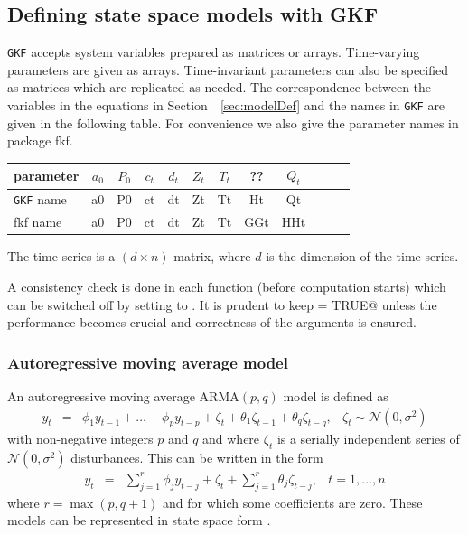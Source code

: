 \documentclass{article}
\newcommand{\GKF}{\texttt{GKF}\xspace}
\begin{document}
\subsection{Defining state space models with GKF}

\GKF accepts system variables prepared as matrices or arrays. Time-varying parameters are
given as arrays. Time-invariant parameters can also be specified as matrices which are
replicated as needed.
The correspondence between the variables in the equations in  Section~~\ref{sec:modelDef} and
the names in \GKF are given in the following table. For convenience we also give the
parameter names in package fkf.
\begin{center}
\begin{tabular}{l|ccccccccccc}
  parameter & $a_{0}$ & $P_{0}$ & $c_{t}$ & $d_{t}$ & $Z_{t}$ & $T_{t}$ & ?? & $Q_{t}$
  \\ \hline{}
  \GKF name & a0     & P0      & ct     & dt     & Zt     & Tt     & Ht & Qt
  \\
  fkf name  & a0     & P0      & ct     & dt     & Zt     & Tt     & GGt & HHt
\end{tabular}
\end{center}
The time series is a $(d\times n)$ matrix, where $d$ is the dimension of the time series.

A consistency check is done in each function (before computation starts) which can be
switched off by setting \verb@checkInputs@ to \verb@FALSE@. It is prudent to keep
\verb@checkInputs = TRUE@ unless the performance becomes crucial and correctness of the
arguments is ensured.


\subsubsection{Autoregressive moving average model}
An autoregressive moving average $\text{ARMA}(p, q)$ model is defined as
\begin{equation}
  \begin{array}{rccl}
    y_t & = & \phi_1 y_{t-1} + \dots + \phi_p y_{t-p} + \zeta_t + \theta_1 \zeta_{t-1} + \theta_q \zeta_{t-q}, & \zeta_t \sim \mathcal{N}(0,\sigma^2)
  \end{array}
  \label{eq:Armapq1}
\end{equation}
 with non-negative integers $p$ and $q$ and where $\zeta_t$ is a serially independent series of $ \mathcal{N}(0,\sigma^2)$ disturbances. This can be written in the form
\begin{equation}
  \begin{array}{rccl}
    y_t & = & \displaystyle \sum_{j=1}^r \phi_j y_{t-j} + \zeta_t + \sum_{j=1}^r \theta_j \zeta_{t-j}, & t=1,\dots,n
  \end{array}
  \label{eq:Armapq2}
\end{equation}
where $r = \max(p, q+1)$ and for which some coefficients are zero. These models can be
represented in state space form \citep[see][chap. 3.4]{durbin2012time}.
\end{document}
